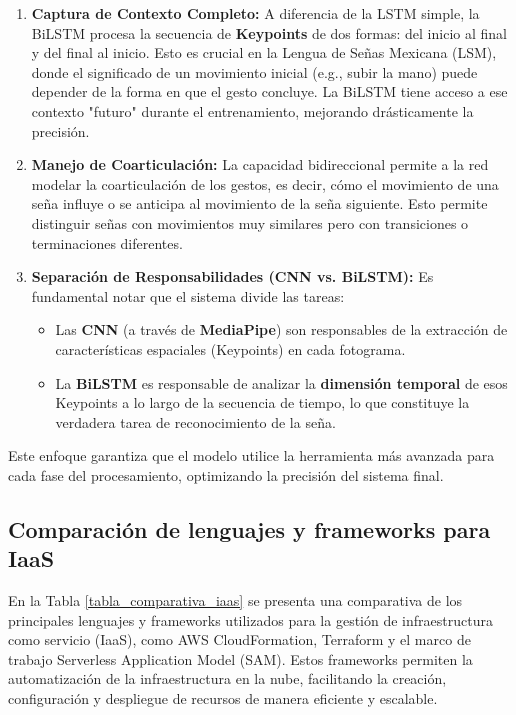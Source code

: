 \begin{enumerate}[label=\arabic*., nosep, itemsep=0pt]
    \item \textbf{Captura de Contexto Completo:} A diferencia de la LSTM simple, la BiLSTM procesa la secuencia de \textbf{Keypoints} de dos formas: del inicio al final y del final al inicio. Esto es crucial en la Lengua de Señas Mexicana (LSM), donde el significado de un movimiento inicial (e.g., subir la mano) puede depender de la forma en que el gesto concluye. La BiLSTM tiene acceso a ese contexto "futuro" durante el entrenamiento, mejorando drásticamente la precisión.
    \item \textbf{Manejo de Coarticulación:} La capacidad bidireccional permite a la red modelar la coarticulación de los gestos, es decir, cómo el movimiento de una seña influye o se anticipa al movimiento de la seña siguiente. Esto permite distinguir señas con movimientos muy similares pero con transiciones o terminaciones diferentes.
    \item \textbf{Separación de Responsabilidades (CNN vs. BiLSTM):} Es fundamental notar que el sistema divide las tareas:
    \begin{itemize}[nosep, itemsep=0pt] %
        \item Las \textbf{CNN} (a través de \textbf{MediaPipe}) son responsables de la extracción de características espaciales (Keypoints) en cada fotograma.
        \item La \textbf{BiLSTM} es responsable de analizar la \textbf{dimensión temporal} de esos Keypoints a lo largo de la secuencia de tiempo, lo que constituye la verdadera tarea de reconocimiento de la seña.
    \end{itemize}
\end{enumerate}
Este enfoque garantiza que el modelo utilice la herramienta más avanzada para cada fase del procesamiento, optimizando la precisión del sistema final.
\clearpage

\subsection{Comparación de lenguajes y frameworks para IaaS}

En la Tabla \ref{tabla_comparativa_iaas} se presenta una comparativa de los principales lenguajes y frameworks utilizados para la gestión de infraestructura como servicio (IaaS), como AWS CloudFormation, Terraform y el marco de trabajo Serverless Application Model (SAM). Estos frameworks permiten la automatización de la infraestructura en la nube, facilitando la creación, configuración y despliegue de recursos de manera eficiente y escalable.


